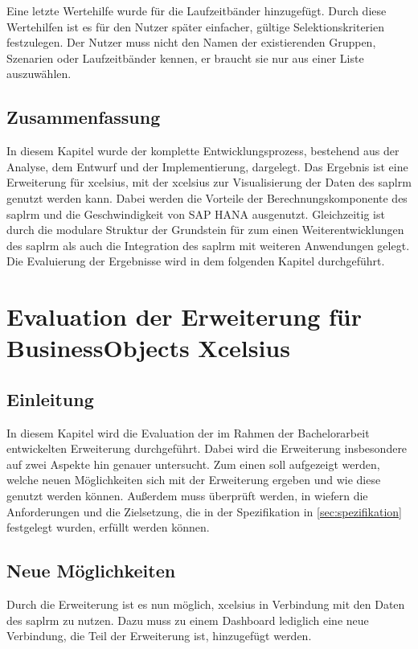 \begin{onehalfspacing}
Eine letzte Wertehilfe wurde für die Laufzeitbänder hinzugefügt. Durch diese Wertehilfen ist es für den Nutzer später einfacher, gültige Selektionskriterien festzulegen. Der Nutzer muss nicht den Namen der existierenden Gruppen, Szenarien oder Laufzeitbänder kennen, er braucht sie nur aus einer Liste auszuwählen.

\section{Zusammenfassung}
In diesem Kapitel wurde der komplette Entwicklungsprozess, bestehend aus der Analyse, dem Entwurf und der Implementierung, dargelegt. Das Ergebnis ist eine Erweiterung für \gls{xcelsius}, mit der \gls{xcelsius} zur Visualisierung der Daten des \gls{saplrm} genutzt werden kann. Dabei werden die Vorteile der Berechnungskomponente des \gls{saplrm} und die Geschwindigkeit von SAP HANA ausgenutzt. Gleichzeitig ist durch die modulare Struktur der Grundstein für zum einen Weiterentwicklungen des \gls{saplrm} als auch die Integration des \gls{saplrm} mit weiteren Anwendungen gelegt. Die Evaluierung der Ergebnisse wird in dem folgenden Kapitel durchgeführt.

\chapter{Evaluation der Erweiterung für BusinessObjects Xcelsius}

\section{Einleitung}
In diesem Kapitel wird die Evaluation der im Rahmen der Bachelorarbeit entwickelten Erweiterung durchgeführt. Dabei wird die Erweiterung insbesondere auf zwei Aspekte hin genauer untersucht. Zum einen soll aufgezeigt werden, welche neuen Möglichkeiten sich mit der Erweiterung ergeben und wie diese genutzt werden können. Außerdem muss überprüft werden, in wiefern die Anforderungen und die Zielsetzung, die in der Spezifikation in \vref{sec:spezifikation} festgelegt wurden, erfüllt werden können.

\section{Neue Möglichkeiten}
Durch die Erweiterung ist es nun möglich, \gls{xcelsius} in Verbindung mit den Daten des \gls{saplrm} zu nutzen. Dazu muss zu einem Dashboard lediglich eine neue Verbindung, die Teil der Erweiterung ist, hinzugefügt werden.


\end{onehalfspacing}
